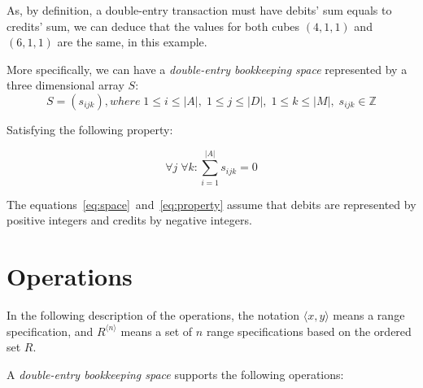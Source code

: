 \documentclass{article}
\begin{document}
As, by definition, a double-entry transaction must have debits' sum
equals to credits' sum, we can deduce that the values for both
cubes $(4,1,1)$ and $(6,1,1)$ are the same, in this example.

More specifically, we can have a \emph{double-entry bookkeeping space} 
represented by a three dimensional array $S$:
\begin{equation}
	\label{eq:space}
	S = \left(s_{ijk}\right), where
	\; 1 \leq i \leq |A|, \; 1 \leq j \leq |D|, \; 1 \leq k \leq |M|, 
	\; s_{ijk} \in \mathbb{Z}
\end{equation}

Satisfying the following property:

\begin{equation}
	\label{eq:property}
	\forall j \; \forall k: \sum_{i=1}^{|A|}{s_{ijk}} = 0
\end{equation}

The equations~\eqref{eq:space}~and~\eqref{eq:property}
assume that debits are represented by positive integers
and credits by negative integers.

\section{Operations}

In the following description of the operations, the notation $\langle x, y \rangle$ means
a range specification, and $R^{\langle n \rangle}$ means a set of $n$
range specifications based on the ordered set $R$.

A \emph{double-entry bookkeeping space} supports the following operations:
\end{document}

